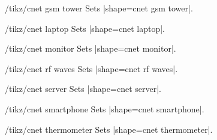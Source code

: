 \documentclass[a4paper]{ltxdoc}
\begin{document}
\begin{stylekey}{/tikz/cnet gsm tower}
Sets |shape={cnet gsm tower}|.
\begin{codeexample}[preamble={\usetikzlibrary{shapes.cnet.gsmtower}}]
\end{codeexample}
\end{stylekey}

\begin{stylekey}{/tikz/cnet laptop}
Sets |shape={cnet laptop}|.
\begin{codeexample}[preamble={\usetikzlibrary{shapes.cnet.laptop}}]
\end{codeexample}
\end{stylekey}

\begin{stylekey}{/tikz/cnet monitor}
Sets |shape={cnet monitor}|.
\begin{codeexample}[preamble={\usetikzlibrary{shapes.cnet.monitor}}]
\end{codeexample}
\end{stylekey}

\begin{stylekey}{/tikz/cnet rf waves}
Sets |shape={cnet rf waves}|.
\begin{codeexample}[preamble={\usetikzlibrary{shapes.cnet.rfwaves}}]
\end{codeexample}
\end{stylekey}

\begin{stylekey}{/tikz/cnet server}
Sets |shape={cnet server}|.
\begin{codeexample}[preamble={\usetikzlibrary{shapes.cnet.server}}]
\end{codeexample}
\end{stylekey}

\begin{stylekey}{/tikz/cnet smartphone}
Sets |shape={cnet smartphone}|.
\begin{codeexample}[preamble={\usetikzlibrary{shapes.cnet.smartphone}}]
\end{codeexample}
\end{stylekey}

\begin{stylekey}{/tikz/cnet thermometer}
Sets |shape={cnet thermometer}|.
\begin{codeexample}[preamble={\usetikzlibrary{shapes.cnet.thermometer}}]
\end{codeexample}
\end{stylekey}
\end{document}
